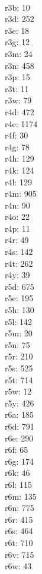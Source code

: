 \begin{multicols}{8}
  \\ r3b: 10
  \\ r3d: 252
  \\ r3e: 18
  \\ r3g: 12
  \\ r3m: 24
  \\ r3n: 458
  \\ r3p: 15
  \\ r3t: 11
  \\ r3w: 79
  \\ r4d: 472
  \\ r4e: 1174
  \\ r4f: 30
  \\ r4g: 78
  \\ r4h: 129
  \\ r4k: 124
  \\ r4l: 129
  \\ r4m: 905
  \\ r4n: 90
  \\ r4o: 22
  \\ r4p: 11
  \\ r4r: 49
  \\ r4s: 142
  \\ r4t: 262
  \\ r4y: 39
  \\ r5d: 675
  \\ r5e: 195
  \\ r5h: 130
  \\ r5l: 142
  \\ r5m: 20
  \\ r5n: 75
  \\ r5r: 210
  \\ r5s: 525
  \\ r5t: 714
  \\ r5w: 12
  \\ r5y: 426
  \\ r6a: 185
  \\ r6d: 791
  \\ r6e: 290
  \\ r6f: 65
  \\ r6g: 174
  \\ r6k: 46
  \\ r6l: 115
  \\ r6m: 135
  \\ r6n: 775
  \\ r6r: 415
  \\ r6s: 464
  \\ r6t: 710
  \\ r6v: 715
  \\ r6w: 43

\end{multicols}
